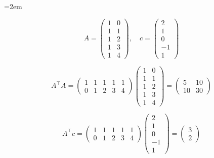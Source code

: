 \begin{solution}    

    \vspace{1\baselineskip}

    \leftskip=2em

    \begin{equation*}
        A = \begin{pmatrix}
            1 & 0\\
            1 & 1\\
            1 & 2\\
            1 & 3\\
            1 & 4
        \end{pmatrix}, \quad
        c = \begin{pmatrix}
            2\\
            1\\
            0\\
            -1\\
            1
        \end{pmatrix}
    \end{equation*}

    \vspace{1\baselineskip}

    \begin{equation*}
        A^\top A = \begin{pmatrix}
            1 & 1 & 1 & 1 & 1\\
            0 & 1 & 2 & 3 & 4
        \end{pmatrix} \begin{pmatrix}
            1 & 0\\
            1 & 1\\
            1 & 2\\
            1 & 3\\
            1 & 4
        \end{pmatrix} = \begin{pmatrix}
            5 & 10\\
            10 & 30
        \end{pmatrix}
    \end{equation*}

    \vspace{1\baselineskip}

    \begin{equation*}
        A^\top c = \begin{pmatrix}
            1 & 1 & 1 & 1 & 1\\
            0 & 1 & 2 & 3 & 4
        \end{pmatrix} \begin{pmatrix}
            2\\
            1\\
            0\\
            -1\\
            1
        \end{pmatrix} = \begin{pmatrix}
            3\\
            2
        \end{pmatrix}
    \end{equation*}


\end{solution}
